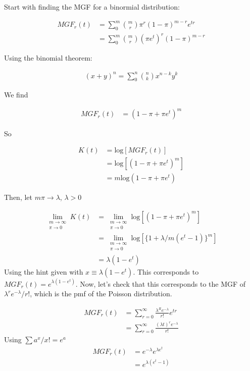 \documentclass[11pt]{article}
\begin{document}
Start with finding the MGF for a binormial distribution:

\begin{align*}
    MGF_r(t) &= \sum_{0}^{m}{m \choose r} \pi^r (1-\pi)^{m-r}e^{tr}\\
    &= \sum_{0}^{m}{m \choose r} (\pi e^t)^r (1-\pi)^{m-r}
\end{align*}

Using the binomial theorem:


\begin{align*}
    (x+y)^n = \sum_{0}^{n} {n \choose k} x^{n-k}y^k
\end{align*}

We find 

\begin{align*}
    MGF_r(t) &= (1-\pi+\pi e^t)^m
\end{align*}

So 

\begin{align*}
   K(t) &= \text{log}[MGF_r(t)]\\
   &=\text{log}[(1-\pi+\pi e^t)^m]\\
   &=m\text{log}(1-\pi+\pi e^t)
\end{align*}


Then, let $m\pi \to \lambda$,  $\lambda >0$

\begin{align*}
    \lim_{\substack{m\to\infty\\ \pi\to0}} K(t) & =  \lim_{\substack{m\to\infty\\ \pi\to0}} \text{log}[(1-\pi+\pi e^t)^m] \\
    &= \lim_{\substack{m\to\infty\\ \pi\to0}} \text{log}[\{1+\lambda / m (e^t-1)\}^m] \\
    &= \lambda(1-e^t)
\end{align*}
Using the hint given with $x\equiv \lambda(1-e^t)$. This corresponds to $MGF_r(t) = e^{\lambda(1-e^t)}$. Now, let's check that this corresponds to the MGF of $ \lambda^re^{-\lambda}/r!$, which is the pmf of the Poisson distribution.


\begin{align*}
    MGF_r(t) &=  \sum_{r=0}^{\infty} \frac{\lambda^Re^{-\lambda}}{r!}e^{tr}\\
    &=  \sum_{r=0}^{\infty} \frac{(\lambda t)^r e^{-\lambda}}{r!}
\end{align*}
Using $\sum a^x/x! = e^a$
\begin{align*}
    MGF_r(t) &= e^{-\lambda} e^{\lambda e^t}\\
    &= e^{\lambda(e^t-1)}
\end{align*}
\end{document}
